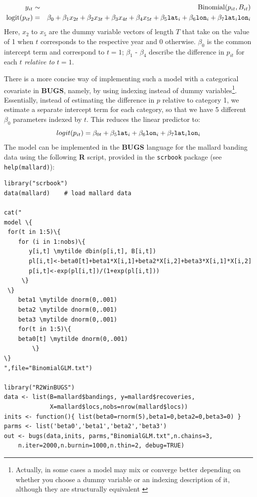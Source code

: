 {{\begin{eqnarray*}
y_{it} &\sim & \mbox{Binomial}(p_{it}, B_{it}) \\
\mbox{logit}(p_{it}) &=& \beta_0 + \beta_1 x_{2t}+ \beta_2 x_{3t} +
\beta_3 x_{4t} + \beta_4 x_{5t} + 
\beta_5 \mbox{\tt lat}_i + \beta_6 \mbox{\tt lon}_i + \beta_7
\mbox{\tt lat}_i \mbox{\tt lon}_i
\end{eqnarray*}
Here, $x_{2}$ to $x_{5}$ are the dummy variable vectors of length $T$
that take on the value of 1 when $t$ corresponds to the respective
year and 0 otherwise. $\beta_0$ is the common intercept term and
correspond to $t=1$; $\beta_1$ - $\beta_4$ describe the difference in
$p_{it}$ for each $t$ \emph{relative to} $t=1$.

There is a more concise way of implementing such a model with a
categorical covariate in {\bf BUGS}, namely, by using indexing instead
of dummy variables\footnote{Actually, in some cases a model may mix or
  converge better depending on whether you choose a dummy variable or
  an indexing description of it, although they are structurally
  equivalent \citep{kery:2010}}. Essentially, instead of estimating
the difference in $p$ relative to category 1, we estimate a separate
intercept term for each category, so that we have 5 different $\beta_0$
parameters indexed by $t$. This reduces the linear predictor to:
\[
logit(p_{it}) = \beta_{0t} +  \beta_5 \mbox{\tt lat}_i + \beta_6
\mbox{\tt lon}_i + \beta_7 \mbox{\tt lat}_i \mbox{\tt lon}_i
\]
The model can be implemented in the {\bf BUGS} language for the
mallard banding data using the following {\bf R} script, provided in
the \mbox{\tt scrbook} package (see \mbox{\tt help(mallard)}): 
{\small
\begin{Verbatim}[commandchars=\\\{\}] 
library("scrbook")
data(mallard)    # load mallard data

cat("
model \{
 for(t in 1:5)\{
    for (i in 1:nobs)\{
       y[i,t] \mytilde dbin(p[i,t], B[i,t])
       pl[i,t]<-beta0[t]+beta1*X[i,1]+beta2*X[i,2]+beta3*X[i,1]*X[i,2]
       p[i,t]<-exp(pl[i,t])/(1+exp(pl[i,t]))
     \}
 \}
	beta1 \mytilde dnorm(0,.001)
	beta2 \mytilde dnorm(0,.001)
	beta3 \mytilde dnorm(0,.001)
	for(t in 1:5)\{
 	beta0[t] \mytilde dnorm(0,.001)  
        \}
\}
",file="BinomialGLM.txt")

library("R2WinBUGS")
data <- list(B=mallard$bandings, y=mallard$recoveries,
             X=mallard$locs,nobs=nrow(mallard$locs))
inits <- function(){ list(beta0=rnorm(5),beta1=0,beta2=0,beta3=0) }
parms <- list('beta0','beta1','beta2','beta3')
out <- bugs(data,inits, parms,"BinomialGLM.txt",n.chains=3,
 	n.iter=2000,n.burnin=1000,n.thin=2, debug=TRUE)
\end{Verbatim}


}}}

